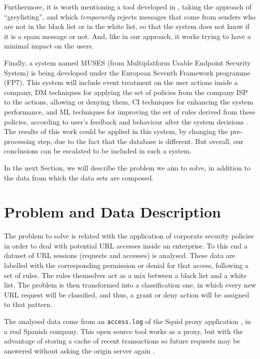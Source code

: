 \documentclass{llncs}
\begin{document}
Furthermore, it is worth mentioning a tool developed in  \cite{harris2003next}, taking the approach of ``greylisting'',
and which \textit{temporarily} rejects messages that come from senders
who are not in the black list or in the white list, so that the system
does not know if it is a spam message or not. And, like in our
approach, it works trying to have a minimal impact on the users.

Finally, a system named MUSES (from Multiplatform Usable Endpoint
Security System) \cite{MUSES_SAC_14} is being developed under the
European Seventh Framework  programme (FP7). This system will include
event treatment on the user actions inside a company, DM techniques
for applying the set of policies from the company ISP to the actions,
allowing or denying them, CI techniques for enhancing the system
performance, and ML techniques for improving the set of rules derived
from these policies, according to user's feedback and behaviour after
the system decisions \cite{muses_sotics_13}. The results of this work
could be applied in this system, by changing the pre-processing step,
due to the fact that the database is different. But overall, our
conclusions can be escalated to be included in such a system.

In the next Section, we will describe the problem we aim to solve, in addition to the data from which the data sets are composed.

%

\section{Problem and Data Description}
\label{sec:problemDescription}

\noindent The problem to solve is related with the application of corporate security policies in order to deal with potential URL accesses inside an enterprise. To this end a dataset of URL sessions (requests and accesses) is analysed. These data are labelled with the corresponding permission or denial for that access, following a set of rules. The rules themselves act as a mix between a black list and a white list. The problem is then transformed into a classification one, in which every new URL request will be classified, and thus, a grant or deny action will be assigned to that pattern.

The analysed data come from an \texttt{access.log} of the Squid proxy application \cite{squid:site}, in a real Spanish company. This open source tool works as a proxy, but with the advantage of storing a cache of recent transactions so future requests may be answered without asking the origin server again \cite{DuaneWessels2004}.
\end{document}
